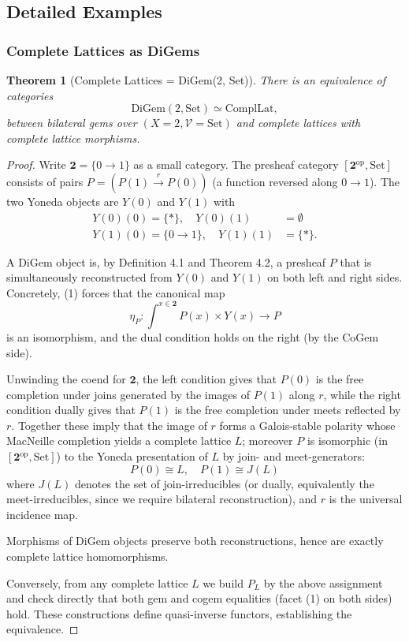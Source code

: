 \documentclass[11pt]{article}
\theoremstyle{plain}
\newtheorem{theorem}{Theorem}[section]
\theoremstyle{definition}
\theoremstyle{remark}
\newcommand{\V}{\mathcal{V}}
\newcommand{\op}{\mathrm{op}}
\begin{document}
\subsection{Detailed Examples}

\subsubsection{Complete Lattices as DiGems}

\begin{theorem}[Complete Lattices = DiGem(2, Set)]
There is an equivalence of categories
$$
\mathrm{DiGem}(2, \mathrm{Set}) \simeq \mathrm{ComplLat},
$$
between bilateral gems over $(X = 2, \V = \mathrm{Set})$ and complete lattices with complete lattice morphisms.
\end{theorem}

\begin{proof}
Write $\mathbf{2} = \{0 \to 1\}$ as a small category. The presheaf category $[\mathbf{2}^{\op}, \mathrm{Set}]$ consists of pairs $P = (P(1) \xrightarrow{r} P(0))$ (a function reversed along $0 \to 1$). The two Yoneda objects are $Y(0)$ and $Y(1)$ with
\begin{align}
Y(0)(0) = \{*\}, \quad Y(0)(1) &= \emptyset \\
Y(1)(0) = \{0 \to 1\}, \quad Y(1)(1) &= \{*\}.
\end{align}

A DiGem object is, by Definition 4.1 and Theorem 4.2, a presheaf $P$ that is simultaneously reconstructed from $Y(0)$ and $Y(1)$ on both left and right sides. Concretely, (1) forces that the canonical map
$$
\eta_P : \int^{x \in \mathbf{2}} P(x) \times Y(x) \to P
$$
is an isomorphism, and the dual condition holds on the right (by the CoGem side). 

Unwinding the coend for $\mathbf{2}$, the left condition gives that $P(0)$ is the free completion under joins generated by the images of $P(1)$ along $r$, while the right condition dually gives that $P(1)$ is the free completion under meets reflected by $r$. Together these imply that the image of $r$ forms a Galois-stable polarity whose MacNeille completion yields a complete lattice $L$; moreover $P$ is isomorphic (in $[\mathbf{2}^{\op}, \mathrm{Set}]$) to the Yoneda presentation of $L$ by join- and meet-generators:
$$
P(0) \cong L, \quad P(1) \cong J(L)
$$
where $J(L)$ denotes the set of join-irreducibles (or dually, equivalently the meet-irreducibles, since we require bilateral reconstruction), and $r$ is the universal incidence map. 

Morphisms of DiGem objects preserve both reconstructions, hence are exactly complete lattice homomorphisms.

Conversely, from any complete lattice $L$ we build $P_L$ by the above assignment and check directly that both gem and cogem equalities (facet (1) on both sides) hold. These constructions define quasi-inverse functors, establishing the equivalence.
\end{proof}
\end{document}
